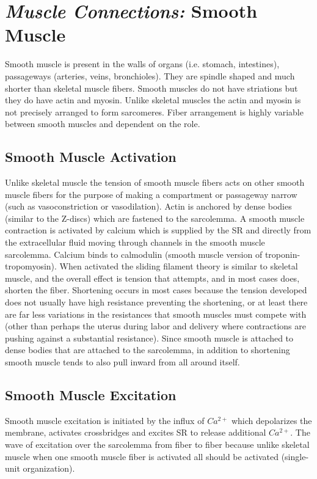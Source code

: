 \section{\textit{Muscle Connections:} Smooth Muscle}

Smooth muscle is present in the walls of organs (i.e. stomach, intestines), passageways (arteries, veins, bronchioles). They are spindle shaped and much shorter than skeletal muscle fibers. Smooth muscles do not have striations but they do have actin and myosin. Unlike skeletal muscles the actin and myosin is not precisely arranged to form sarcomeres. Fiber arrangement is highly variable between smooth muscles and dependent on the role. 

\subsection{Smooth Muscle Activation}

Unlike skeletal muscle the tension of smooth muscle fibers acts on other smooth muscle fibers for the purpose of making a compartment or passageway narrow (such as vasoconstriction or vasodilation). Actin is anchored by dense bodies (similar to the Z-discs) which are fastened to the sarcolemma. A smooth muscle contraction is activated by calcium which is supplied by the SR and directly from the  extracellular fluid moving through channels in the smooth muscle sarcolemma. Calcium binds to calmodulin (smooth muscle version of troponin-tropomyosin). When activated the sliding filament theory is similar to skeletal muscle, and the overall effect is tension that attempts, and in most cases does, shorten the fiber. Shortening occurs in most cases because the tension developed does not usually have high resistance preventing the shortening, or at least there are far less variations in the resistances that smooth muscles must compete with (other than perhaps the uterus during labor and delivery where contractions are pushing against a substantial resistance). Since smooth muscle is attached to dense bodies that are attached to the sarcolemma, in addition to shortening smooth muscle tends to also pull inward from all around itself. 

\subsection{Smooth Muscle Excitation}

Smooth muscle excitation is initiated by the influx of $Ca^{2+}$ which depolarizes the membrane, activates crossbridges and excites SR to release additional $Ca^{2+}$. The wave of excitation over the sarcolemma from fiber to fiber because unlike skeletal muscle when one smooth muscle fiber is activated all should be activated (single-unit organization).


